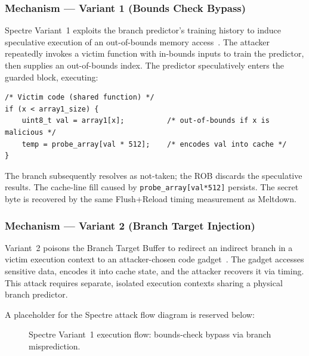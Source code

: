 \subsubsection{Mechanism — Variant 1 (Bounds Check Bypass)}

Spectre Variant~1 exploits the branch predictor's training history to induce
speculative execution of an out-of-bounds memory
access~\cite{kocher2019spectre}. The attacker repeatedly invokes a victim
function with in-bounds inputs to train the predictor, then supplies an
out-of-bounds index. The predictor speculatively enters the guarded block,
executing:

\begin{lstlisting}[style=cstyle, caption={Spectre Variant~1 victim code}, label={lst:spectre_v1_victim}]
/* Victim code (shared function) */
if (x < array1_size) {
    uint8_t val = array1[x];          /* out-of-bounds if x is malicious */
    temp = probe_array[val * 512];    /* encodes val into cache */
}
\end{lstlisting}

The branch subsequently resolves as not-taken; the ROB discards the speculative
results. The cache-line fill caused by \texttt{probe\_array[val*512]} persists.
The secret byte is recovered by the same Flush+Reload timing measurement as
Meltdown.

\subsubsection{Mechanism — Variant 2 (Branch Target Injection)}

Variant~2 poisons the Branch Target Buffer to redirect an indirect branch in a
victim execution context to an attacker-chosen code
gadget~\cite{kocher2019spectre}. The gadget accesses sensitive data, encodes it
into cache state, and the attacker recovers it via timing. This attack requires
separate, isolated execution contexts sharing a physical branch predictor.

A placeholder for the Spectre attack flow diagram is reserved below:

\begin{figure}[h]
  \centering
  \caption{Spectre Variant~1 execution flow: bounds-check bypass via branch misprediction.}
  \label{fig:spectre_v1_flow}
\end{figure}

